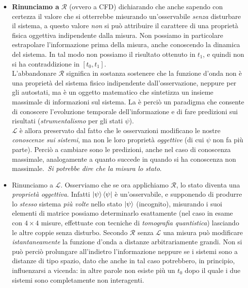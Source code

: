 \documentclass[../../FisicaTeorica.tex]{subfiles}
\begin{document}
\begin{itemize}
\item \textbf{Rinunciamo a} $\mathcal{R}$ (ovvero a CFD) dichiarando che anche sapendo con certezza il valore che si otterrebbe misurando un'osservabile \textit{senza} disturbare il sistema, a questo valore \textit{non} si può attribuire il carattere di una proprietà fisica oggettiva indipendente dalla misura. Non possiamo in particolare estrapolare l'informazione prima della misura, anche conoscendo la dinamica del sistema. In tal modo non possiamo  il risultato ottenuto in $t_1$, e quindi non si ha contraddizione in $[t_0, t_1]$.\\
L'abbandonare $\mathcal{R}$ significa in sostanza sostenere che la funzione d'onda non è una proprietà del sistema fisico indipendente dall'osservazione, neppure per gli autostati, ma è un oggetto matematico che sintetizza un insieme massimale di informazioni sul sistema. La \MQ è perciò un paradigma che consente di conoscere l'evoluzione temporale dell'informazione e di fare predizioni sui risultati (\textit{strumentalismo} per gli stati $\psi$).\\
$\mathcal{L}$ è allora preservato dal fatto che le osservazioni modificano le nostre \textit{conoscenze sui sistemi}, ma non le loro proprietà \textit{oggettive} (di cui $\psi$ non fa più parte). Perciò a cambiare sono le predizioni, anche nel caso di conoscenza massimale, analogamente a quanto succede in \MC quando si ha conoscenza non massimale.\
\textit{Si potrebbe dire che la misura  lo stato}.
\item Rinunciamo a $\mathcal{L}$. Osserviamo che se ora applichiamo $\mathcal{R}$, lo stato diventa una \textit{proprietà oggettiva}. Infatti $\Ket{\psi}\Bra{\psi}$ è un'osservabile, e supponendo di produrre lo \textit{stesso} sistema \textit{più volte} nello stato $\Ket{\psi}$ (incognito), misurando i suoi elementi di matrice possiamo determinarlo esattamente (nel caso in esame con $4\times 4$ misure, effettuate con tecniche di \textit{tomografia quantistica}) lasciando le altre coppie senza disturbo. Secondo $\mathcal{R}$ senza $\mathcal{L}$ una misura può modificare \textit{istantaneamente} la funzione d'onda a distanze arbitrariamente grandi. Non si può perciò prolungare all'indietro l'informazione neppure se i sistemi sono a distanze di tipo spazio, dato che anche in tal caso potrebbero, in principio, influenzarsi a vicenda: in altre parole non esiste più un $t_0$ dopo il quale i due sistemi sono completamente non interagenti.\\

\end{itemize}
\end{document}

